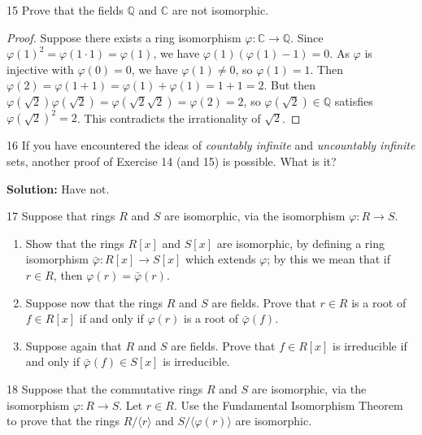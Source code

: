 \begin{problem}{15}
Prove that the fields $\mathbb{Q}$ and $\mathbb{C}$ are not isomorphic.
\end{problem}
\solved

\begin{proof}
    Suppose there exists a ring isomorphism  $\varphi : \mathbb{C} \to \mathbb{Q}$.
    Since $\varphi(1)^2 = \varphi(1 \cdot 1) = \varphi(1)$, we have $\varphi(1)(\varphi(1) - 1) = 0$.
    As $\varphi$ is injective with $\varphi(0) = 0$, we have $\varphi(1) \ne 0$, so $\varphi(1) = 1$.
    Then $\varphi(2) = \varphi(1 + 1) = \varphi(1) + \varphi(1) = 1 + 1 = 2$.
    But then $\varphi(\sqrt{2})\varphi(\sqrt{2}) = \varphi(\sqrt{2}\sqrt{2}) = \varphi(2) = 2$,
        so $\varphi(\sqrt{2}) \in \mathbb{Q}$ satisfies $\varphi(\sqrt{2})^2 = 2$.
    This contradicts the irrationality of $\sqrt{2}$.
\end{proof}

\newpage

\begin{problem}{16}
If you have encountered the ideas of \textit{countably infinite} and \textit{uncountably infinite} sets, another proof of Exercise 14 (and 15) is possible. What is it?
\end{problem}
\unsolved

\textbf{Solution: } Have not.

\begin{problem}{17}
    Suppose that rings $R$ and $S$ are isomorphic, via the isomorphism
    $\varphi : R \to S$.
    \begin{enumerate}
        \item[(a)] Show that the rings $R[x]$ and $S[x]$ are isomorphic, by defining a ring
        isomorphism $\bar{\varphi} : R[x] \to S[x]$ which extends $\varphi$; by this we
        mean that if $r \in R$, then $\varphi(r) = \bar{\varphi}(r)$.
        \item[(b)] Suppose now that the rings $R$ and $S$ are fields. Prove that $r \in R$
        is a root of $f \in R[x]$ if and only if $\varphi(r)$ is a root of
        $\bar{\varphi}(f)$.
        \item[(c)] Suppose again that $R$ and $S$ are fields. Prove that $f \in R[x]$ is
        irreducible if and only if $\bar{\varphi}(f) \in S[x]$ is irreducible.
    \end{enumerate}
\end{problem}
\unsolved

\begin{problem}{18}
Suppose that the commutative rings $R$ and $S$ are isomorphic, via the isomorphism $\varphi : R \to S$. Let $r \in R$. Use the Fundamental Isomorphism Theorem to prove that the rings $R/\langle r \rangle$ and $S/\langle \varphi(r) \rangle$ are isomorphic.
\end{problem}
\solved

